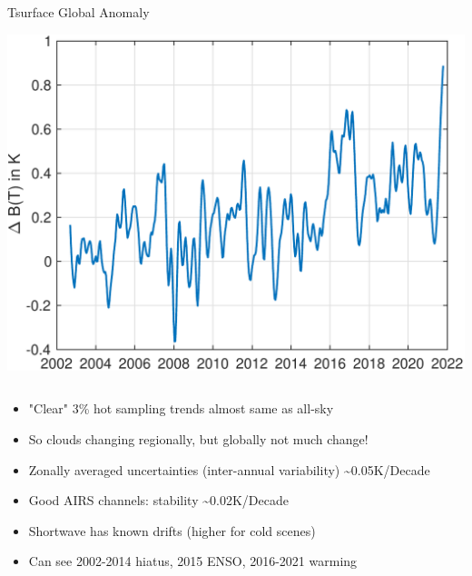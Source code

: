 \documentclass[10pt,t]{beamer}
\begin{document}
\begin{frame}
\begin{columns}
\begin{column}{0.5\columnwidth}
\begin{block}{\footnotesize Tsurface Global Anomaly}
\vspace{-0.05in}
\begin{center}
\includegraphics[width=\linewidth]{SunClimate2022/global_bt1231_anomaly.pdf}
\end{center}
\end{block}
\end{column}
\end{columns}

\vspace{-0.1in}
\small
\begin{itemize}
\item "Clear" 3\% hot sampling trends almost same as all-sky
\item So clouds changing regionally, but globally not much change!
\item Zonally averaged uncertainties (inter-annual variability) \textasciitilde{}0.05K/Decade
\item Good AIRS channels: stability \textasciitilde{}0.02K/Decade
\item Shortwave has known drifts (higher for cold scenes)
\item Can see 2002-2014 hiatus, 2015 ENSO, 2016-2021 warming
\end{itemize}
\end{frame}
\end{document}
